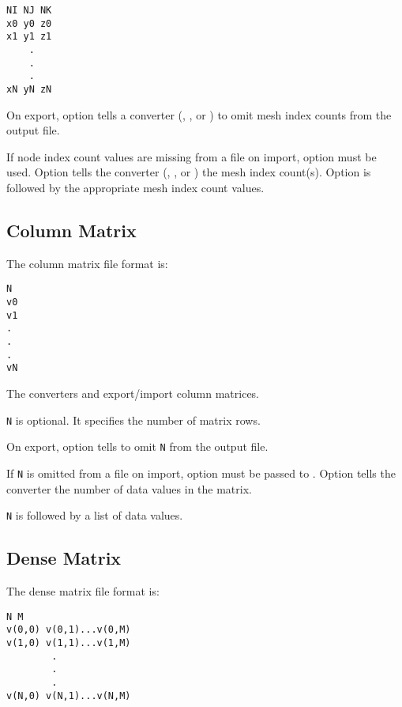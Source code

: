 \begin{verbatim}
NI NJ NK
x0 y0 z0
x1 y1 z1
    .
    .
    .
xN yN zN
\end{verbatim}

On export, option  tells a converter
(, , or
) to omit mesh index counts
from the output file.

If node index count values are missing from a file on import, option
 must be used.  Option  tells the
converter (,
, or
) the mesh index count(s).  Option
 is followed by the appropriate mesh index count
values.

\subsection{Column Matrix}

The column matrix file format is:

\begin{verbatim}
N
v0 
v1
.
.
.
vN
\end{verbatim}

The converters  and  
export/import column matrices.

\verb|N| is optional.  It specifies the number of matrix rows.  

On export, option  tells
 to omit \verb|N| from the output file.

If \verb|N| is omitted from a file on import, option
 must be passed to .
Option  tells the converter the number of data
values in the matrix.

\verb|N| is followed by a list of data values.

\subsection{Dense Matrix}

The dense matrix file format is:

\begin{verbatim}
N M
v(0,0) v(0,1)...v(0,M)
v(1,0) v(1,1)...v(1,M)
        .
        .
        .
v(N,0) v(N,1)...v(N,M)
\end{verbatim}

